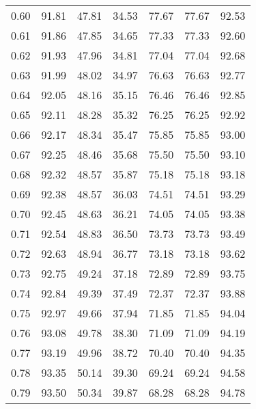 \begin{tabular}{|c|c|c|c|c|c|c|}
      0.60 &     91.81 &     47.81 &      34.53 &   77.67 &      77.67 &         92.53 \\
      0.61 &     91.86 &     47.85 &      34.65 &   77.33 &      77.33 &         92.60 \\
      0.62 &     91.93 &     47.96 &      34.81 &   77.04 &      77.04 &         92.68 \\
      0.63 &     91.99 &     48.02 &      34.97 &   76.63 &      76.63 &         92.77 \\
      0.64 &     92.05 &     48.16 &      35.15 &   76.46 &      76.46 &         92.85 \\
      0.65 &     92.11 &     48.28 &      35.32 &   76.25 &      76.25 &         92.92 \\
      0.66 &     92.17 &     48.34 &      35.47 &   75.85 &      75.85 &         93.00 \\
      0.67 &     92.25 &     48.46 &      35.68 &   75.50 &      75.50 &         93.10 \\
      0.68 &     92.32 &     48.57 &      35.87 &   75.18 &      75.18 &         93.18 \\
      0.69 &     92.38 &     48.57 &      36.03 &   74.51 &      74.51 &         93.29 \\
      0.70 &     92.45 &     48.63 &      36.21 &   74.05 &      74.05 &         93.38 \\
      0.71 &     92.54 &     48.83 &      36.50 &   73.73 &      73.73 &         93.49 \\
      0.72 &     92.63 &     48.94 &      36.77 &   73.18 &      73.18 &         93.62 \\
      0.73 &     92.75 &     49.24 &      37.18 &   72.89 &      72.89 &         93.75 \\
      0.74 &     92.84 &     49.39 &      37.49 &   72.37 &      72.37 &         93.88 \\
      0.75 &     92.97 &     49.66 &      37.94 &   71.85 &      71.85 &         94.04 \\
      0.76 &     93.08 &     49.78 &      38.30 &   71.09 &      71.09 &         94.19 \\
      0.77 &     93.19 &     49.96 &      38.72 &   70.40 &      70.40 &         94.35 \\
      0.78 &     93.35 &     50.14 &      39.30 &   69.24 &      69.24 &         94.58 \\
      0.79 &     93.50 &     50.34 &      39.87 &   68.28 &      68.28 &         94.78 \\

\end{tabular}
